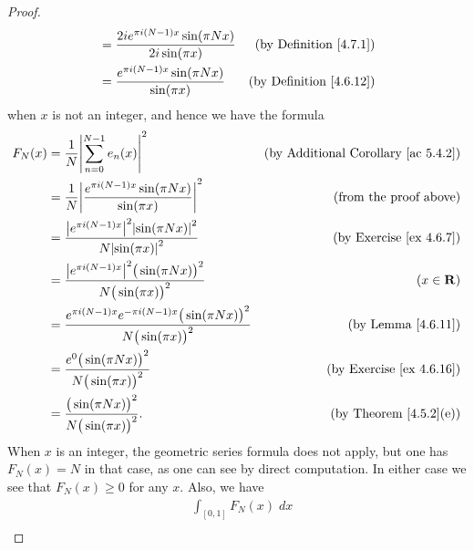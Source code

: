 \begin{proof}
\begin{align*}
                                    & = \frac{2i e^{\pi i (N - 1) x} \sin(\pi N x)}{2i \sin(\pi x)}                                                           & \text{(by Definition \ref{4.7.1})}   \\
                                    & = \frac{e^{\pi i (N - 1) x} \sin(\pi N x)}{\sin(\pi x)}                                                                 & \text{(by Definition \ref{4.6.12})}
    \end{align*}
    when \(x\) is not an integer, and hence we have the formula
    \begin{align*}
        F_N(x) & = \frac{1}{N} \abs{\sum_{n = 0}^{N - 1} e_n(x)}^2                                                       & \text{(by Additional Corollary \ref{ac 5.4.2})} \\
               & = \frac{1}{N} \abs{\frac{e^{\pi i (N - 1) x} \sin(\pi N x)}{\sin(\pi x)}}^2                             & \text{(from the proof above)}                   \\
               & = \frac{\abs{e^{\pi i (N - 1) x}}^2 \abs{\sin(\pi N x)}^2}{N \abs{\sin(\pi x)}^2}                       & \text{(by Exercise \ref{ex 4.6.7})}             \\
               & = \frac{\abs{e^{\pi i (N - 1) x}}^2 \big(\sin(\pi N x)\big)^2}{N \big(\sin(\pi x)\big)^2}               & (x \in \R)                                      \\
               & = \frac{e^{\pi i (N - 1) x} e^{- \pi i (N - 1) x} \big(\sin(\pi N x)\big)^2}{N \big(\sin(\pi x)\big)^2} & \text{(by Lemma \ref{4.6.11})}                  \\
               & = \frac{e^0 \big(\sin(\pi N x)\big)^2}{N \big(\sin(\pi x)\big)^2}                                       & \text{(by Exercise \ref{ex 4.6.16})}            \\
               & = \frac{\big(\sin(\pi N x)\big)^2}{N \big(\sin(\pi x)\big)^2}.                                          & \text{(by Theorem \ref{4.5.2}(e))}
    \end{align*}
    When \(x\) is an integer, the geometric series formula does not apply, but one has \(F_N(x) = N\) in that case, as one can see by direct computation.
    In either case we see that \(F_N(x) \geq 0\) for any \(x\).
    Also, we have
    \begin{align*}
         & \int_{[0, 1]} F_N(x) \; dx                                                                                                                                   \\

\end{align*}
\end{proof}
